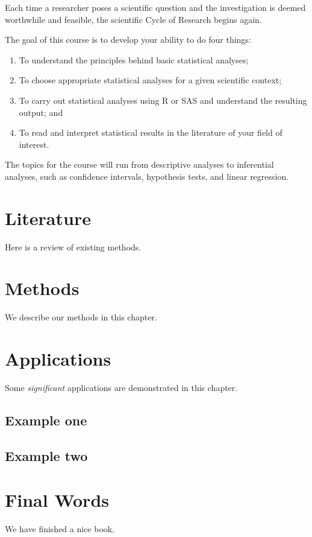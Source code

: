 \documentclass[
]{book}
\providecommand{\tightlist}{%
  \setlength{\itemsep}{0pt}\setlength{\parskip}{0pt}}
\begin{document}
Each time a researcher poses a scientific question and the investigation is deemed worthwhile and feasible, the scientific Cycle of Research begins again.

The goal of this course is to develop your ability to do four things:

\begin{enumerate}
\def\labelenumi{\arabic{enumi}.}
\tightlist
\item
  To understand the principles behind basic statistical analyses;
\item
  To choose appropriate statistical analyses for a given scientific context;
\item
  To carry out statistical analyses using R or SAS and understand the resulting output; and
\item
  To read and interpret statistical results in the literature of your field of interest.
\end{enumerate}

The topics for the course will run from descriptive analyses to inferential analyses, such as confidence intervals, hypothesis tests, and linear regression.

\hypertarget{literature}{%
\chapter{Literature}\label{literature}}

Here is a review of existing methods.

\hypertarget{methods}{%
\chapter{Methods}\label{methods}}

We describe our methods in this chapter.

\hypertarget{applications}{%
\chapter{Applications}\label{applications}}

Some \emph{significant} applications are demonstrated in this chapter.

\hypertarget{example-one}{%
\section{Example one}\label{example-one}}

\hypertarget{example-two}{%
\section{Example two}\label{example-two}}

\hypertarget{final-words}{%
\chapter{Final Words}\label{final-words}}

We have finished a nice book.

  
\end{document}
